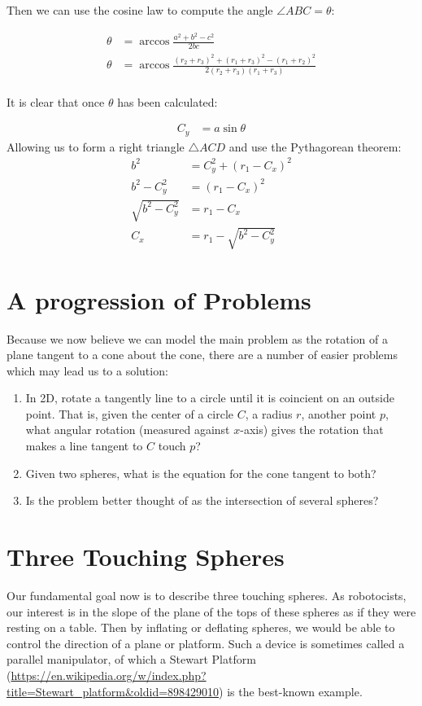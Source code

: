 \documentclass{article}
\begin{document}
Then we can use the cosine law to compute the angle $\angle ABC = \theta$:


\begin{align}
  \theta  &= \arccos{\frac{a^2 + b^2 - c^2}{2bc}} \\
  \theta  &= \arccos{\frac{(r_2+r_3)^2 + (r_1+r_3)^2 - (r_1+r_2)^2}{2(r_2+r_3)(r_1+r_3)}} \\
\end{align}

It is clear that once $\theta$ has been calculated:

\begin{align}
 C_y  &= a\sin{\theta}
\end{align}
Allowing us to form a right triangle $\triangle ACD$ and use the Pythagorean theorem:
\begin{align}
  b^2  &= C_y^2 + (r_1-C_x)^2 \\
  b^2 - C_y^2  &= (r_1-C_x)^2  \\
  \sqrt{b^2 - C_y^2}  &= r_1-C_x  \\
  C_x &= r_1 -  \sqrt{b^2 - C_y^2}
\end{align}

\section{A progression of Problems}

Because we now believe we can model the main problem as the rotation of a plane tangent to a cone about the cone,
there are a number of easier problems which may lead us to a solution:
\begin{enumerate}
\item In 2D, rotate a tangently line to a circle until it is coincient on an outside point.  That is, given the
  center of a circle $C$, a radius $r$, another point $p$, what angular rotation (measured against $x$-axis) gives
  the rotation that makes a line tangent to $C$ touch $p$?
\item Given two spheres, what is the equation for the cone tangent to both?
  \item Is the problem better thought of as the intersection of several spheres?
  \end{enumerate}

\section{Three Touching Spheres}

Our fundamental goal now is to describe three touching spheres. As robotocists,
our interest is in the slope of the plane of the tops of these spheres
as if they were resting on a table. Then by inflating or deflating spheres,
we would be able to control the direction of a plane or platform.
Such a device is sometimes called a parallel manipulator, of which a
Stewart Platform\cite{wiki:stewart} (\url{https://en.wikipedia.org/w/index.php?title=Stewart_platform&oldid=898429010})
is the best-known example.
\end{document}
